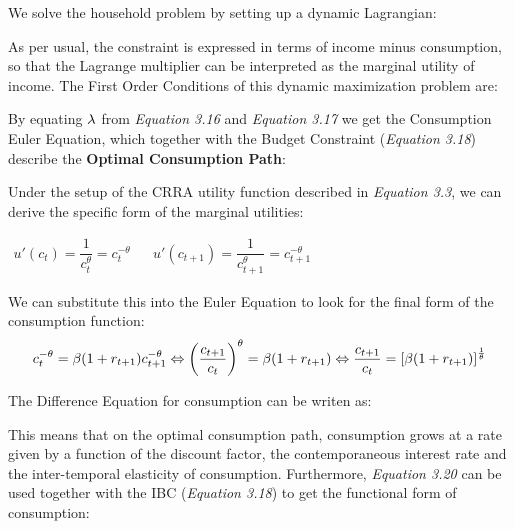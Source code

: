 We solve the household problem by setting up a dynamic Lagrangian:

As per usual, the constraint is expressed in terms of income minus consumption, so that the Lagrange multiplier can be interpreted as the marginal utility of income. The First Order Conditions of this dynamic maximization problem are:
\bigskip
{}
\bigskip
{}

\bigskip
By equating $\lambda$ from \textit{Equation 3.16} and \textit{Equation 3.17} we get the Consumption Euler Equation, which together with the Budget Constraint (\textit{Equation 3.18}) describe the \textbf{Optimal Consumption Path}:

\bigskip
Under the setup of the CRRA utility function described in \textit{Equation 3.3}, we can derive the specific form of the marginal utilities:
\begin{center}
$\begin{array}{llllll}
u'(c_t)=\dfrac{1}{c_t^\theta}=c_t^{-\theta} & & u'(c_{t+1})=\dfrac{1}{c_{t+1}^\theta}=c_{t+1}^{-\theta}
\end{array}$
\end{center}

We can substitute this into the Euler Equation to look for the final form of the consumption function:
$$c_t^{-\theta}=\beta (1+r_{t+1}) c_{t+1}^{-\theta} \Leftrightarrow \left(\dfrac{c_{t+1}}{c_t}\right)^{\theta}=\beta (1+r_{t+1}) \Leftrightarrow \dfrac{c_{t+1}}{c_t}= \left[ \beta (1+r_{t+1}) \right] ^ \frac{1}{\theta}$$

The Difference Equation for consumption can be writen as:

This means that on the optimal consumption path, consumption grows at a rate given by a function of the discount factor, the contemporaneous interest rate and the inter-temporal elasticity of consumption. Furthermore, \textit{Equation 3.20} can be used together with the IBC (\textit{Equation 3.18}) to get the functional form of consumption:

